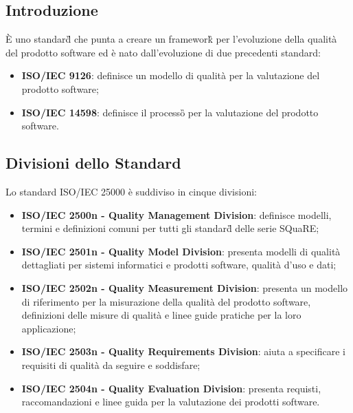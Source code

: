\subsection{Introduzione}
È uno standard\G{} che punta a creare un framework\G{} per l'evoluzione della qualità del prodotto software ed è nato dall'evoluzione di due precedenti standard:
\begin{itemize}
	\item \textbf{ISO/IEC 9126}: definisce un modello di qualità per la valutazione del prodotto software;
	\item \textbf{ISO/IEC 14598}: definisce il processo\G{} per la valutazione del prodotto software.
\end{itemize}

\subsection{Divisioni dello Standard}
Lo standard ISO/IEC 25000 è suddiviso in cinque divisioni:
\begin{itemize}
	\item \textbf{ISO/IEC 2500n - Quality Management Division}: definisce modelli, termini e definizioni comuni per tutti gli standard\G{} delle serie SQuaRE;
	\item \textbf{ISO/IEC 2501n - Quality Model Division}: presenta modelli di qualità dettagliati per sistemi informatici e prodotti software, qualità d'uso e dati;
	\item \textbf{ISO/IEC 2502n - Quality Measurement Division}: presenta un modello di riferimento per la misurazione della qualità del prodotto software, definizioni delle misure di qualità e linee guide pratiche per la loro applicazione;
	\item \textbf{ISO/IEC 2503n - Quality Requirements Division}: aiuta a specificare i requisiti di qualità da seguire e soddisfare;
	\item \textbf{ISO/IEC 2504n - Quality Evaluation Division}: presenta requisti, raccomandazioni e linee guida per la valutazione dei prodotti software.
\end{itemize}


